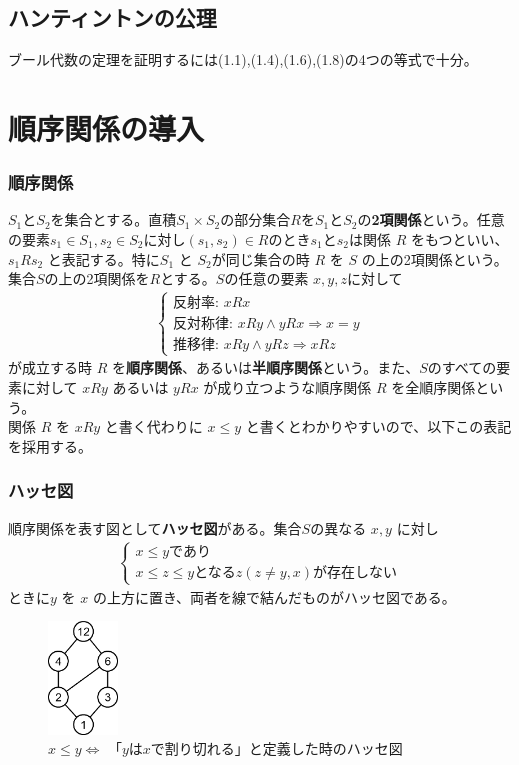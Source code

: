 \documentclass[a4j,10pt,oneside,openany,fleqn]{jsbook}
\begin{document}
\subsection{ハンティントンの公理}

ブール代数の定理を証明するには(1.1),(1.4),(1.6),(1.8)の4つの等式で十分。


\section{順序関係の導入}

\subsubsection{順序関係}
$S_1$と$S_2$を集合とする。直積$S_1 \times  S_2$の部分集合$R$を$S_1$と$S_2$の\textbf{2項関係}という。任意の要素$s_1 \in S_1, s_2 \in S_2$に対し$(s_1, s_2) \in R$のとき$s_1$と$s_2$は関係 $R$ をもつといい、$s_1 R s_2$ と表記する。特に$S_1$ と $S_2$が同じ集合の時 $R$ を $S$ の上の2項関係という。
\\
集合$S$の上の2項関係を$R$とする。$S$の任意の要素 $x,y,z$に対して
\begin{align*}
  \begin{cases}
    \textrm{反射率: } xRx\\
    \textrm{反対称律: } xRy \wedge yRx \Rightarrow x=y \\
    \textrm{推移律: } xRy \wedge yRz \Rightarrow xRz 
  \end{cases}
\end{align*}
が成立する時 $R$ を\textbf{順序関係}、あるいは\textbf{半順序関係}という。また、$S$のすべての要素に対して $xRy$ あるいは $yRx$ が成り立つような順序関係 $R$ を全順序関係という。\\
関係 $R$ を $xRy$ と書く代わりに $x \leq y$ と書くとわかりやすいので、以下この表記を採用する。

\subsubsection{ハッセ図}
順序関係を表す図として\textbf{ハッセ図}がある。集合$S$の異なる $x,y$ に対し
\begin{align*}
  \begin{cases}
    x \leq y \textrm{であり}\\
    x \leq z \leq y \textrm{となる} z(z \neq y, x)\textrm{が存在しない}
  \end{cases}
\end{align*}
ときに$y$ を $x$ の上方に置き、両者を線で結んだものがハッセ図である。
\begin{figure}[h]
  \centering\includegraphics[height=3cm]{Images/Hasse_example.png}
  \caption{$x\leq y \Leftrightarrow$ 「$y$は$x$で割り切れる」と定義した時のハッセ図}
\end{figure}
\end{document}
